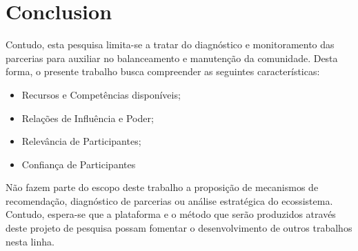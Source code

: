 \chapter{Conclusion}\label{cap:conclusion}

Contudo, esta pesquisa limita-se a tratar do diagnóstico e monitoramento das parcerias para auxiliar no balanceamento e manutenção da comunidade. Desta forma, o presente trabalho busca compreender as seguintes características: 

\begin{itemize}
	\item Recursos e Competências disponíveis;
	\item Relações de Influência e Poder; 
	\item Relevância de Participantes;
	\item Confiança de Participantes
\end{itemize}

Não fazem parte do escopo deste trabalho a proposição de mecanismos de recomendação, diagnóstico de parcerias ou análise estratégica do ecossistema. Contudo, espera-se que a plataforma e o método que serão produzidos através deste projeto de pesquisa possam fomentar o desenvolvimento de outros trabalhos nesta linha. 


